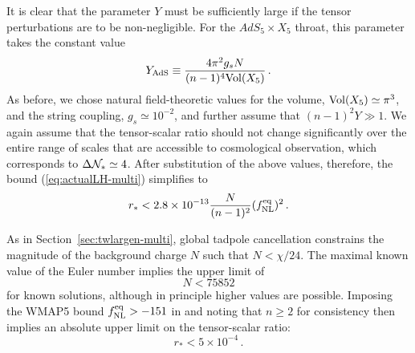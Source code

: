 It is clear that the parameter $Y$ 
must be sufficiently large if the tensor perturbations 
are to be non-negligible. For the $AdS_5 \times X_5$ throat, this parameter  
takes the constant value    
% 
\begin{equation}
\label{eq:YAds-multi}
Y_{\mathrm{AdS}} \equiv \frac{4\pi^2 g_s N}{(n-1)^4 \mathrm{Vol} (X_5)} \,.
\end{equation}
% 
As before, we chose natural field-theoretic values for the volume, 
$\mathrm{Vol} (X_5) \simeq \pi^3$, and the string coupling, 
$g_s \simeq 10^{-2}$, and further assume that 
$(n-1)^2 Y \gg 1$. 
We again assume that the tensor-scalar ratio should not change significantly
over the entire range of scales that are accessible to cosmological
observation, which corresponds to $\Delta \mathcal{N}_* \simeq 4$. 
After substitution of the above values, therefore, 
the bound (\ref{eq:actualLH-multi}) simplifies to
%  
\begin{equation}
\label{eq:AdSupper-multi}
r_* < 2.8 \times 10^{-13} \frac{N}{(n-1)^2} (f_{\mathrm{NL}}^{\mathrm{eq}})^2 \,.
\end{equation}
% 

As in Section~\ref{sec:twlargen-multi},
global tadpole cancellation constrains the magnitude of
the background charge $N$ such that $N < \chi /
24$. 
The maximal known value of the Euler number implies the upper limit of 
% 
\begin{equation}
\label{eq:Nlimit-multi} 
N < 75852
\end{equation}
% 
for known solutions, although in principle higher values are possible. 
Imposing the WMAP5 bound $f_{\mathrm{NL}}^{\mathrm{eq}}>-151$ in 
and noting that $n \ge 2$ for consistency then implies an absolute
upper limit 
on the tensor-scalar ratio:
%  
\begin{equation}
\label{eq:rupper-multi}
r_* < 5 \times 10^{-4} \, .
\end{equation}
% 


